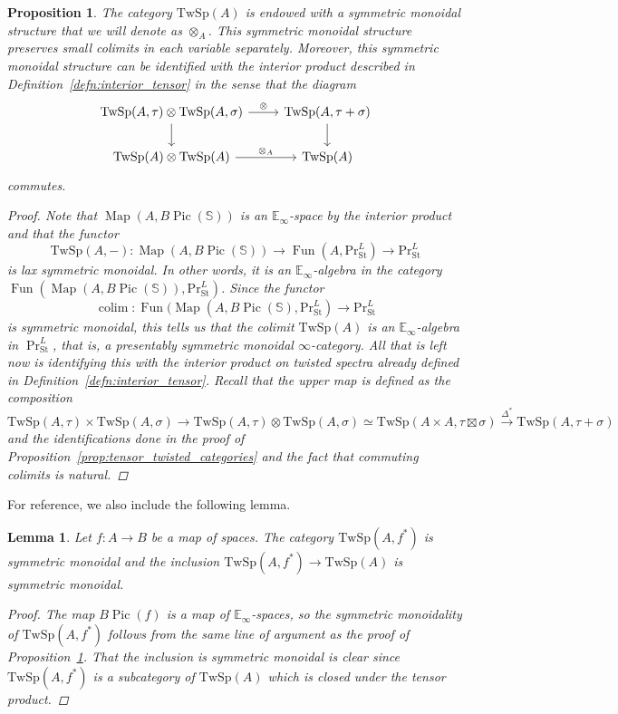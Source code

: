 \documentclass[10pt]{amsart}
\newcommand{\longto}{\longrightarrow}
\theoremstyle{plain}
\newtheorem{lemma}[theorem]{Lemma}
\newtheorem{proposition}[theorem]{Proposition}
\theoremstyle{definition}
\DeclareMathOperator*{\colim}{colim}
\DeclareMathOperator{\Fun}{Fun}
\DeclareMathOperator{\Pic}{Pic}
\DeclareMathOperator{\Map}{Map}
\newcommand{\St}{\mathrm{St}}
\newcommand{\bE}{\mathbb{E}}
\newcommand{\bS}{\mathbb{S}}
\newcommand{\TwSp}{\mathrm{TwSp}}
\begin{document}
\begin{proposition} \label{prop:total_cat_symm_mon}
  The category $\TwSp(A)$ is endowed with a symmetric monoidal structure that we will denote as $\otimes_A$.
  This symmetric monoidal structure preserves small colimits in each variable separately.
  Moreover, this symmetric monoidal structure can be identified with the interior product described in Definition~\ref{defn:interior_tensor} in the sense that the diagram
  \[
  \begin{tikzcd}
    \TwSp(A,\tau) \otimes \TwSp(A,\sigma) \arrow[r,"\otimes"] \arrow[d] & \TwSp(A , \tau + \sigma) \arrow[d] \\
    \TwSp(A) \otimes \TwSp(A) \arrow[r,"\otimes_A"] & \TwSp(A)
  \end{tikzcd}
  \]
  commutes.
  \begin{proof}
    Note that $\Map(A,B\Pic(\bS))$ is an $\bE_\infty$-space by the interior product and that the functor
    \[
    \TwSp(A,-) : \Map(A,B\Pic(\bS)) \longto \Fun(A,\mathrm{Pr}^{L}_{\St}) \longto \mathrm{Pr}^{L}_{\St}
    \]
    is lax symmetric monoidal. In other words, it is an $\bE_\infty$-algebra in the category $\Fun(\Map(A,B\Pic(\bS)),\mathrm{Pr}^{L}_{\St})$.
    Since the functor
    \[
    \colim : \Fun(\Map(A,B\Pic(\bS),\mathrm{Pr}^{L}_{\St}) \longto \mathrm{Pr}^{L}_{\St}
    \]
    is symmetric monoidal, this tells us that the colimit $\TwSp(A)$ is an $\bE_\infty$-algebra in $\Pr^L_{\St}$, that is, a presentably symmetric monoidal $\infty$-category.
    All that is left now is identifying this with the interior product on twisted spectra already defined in Definition~\ref{defn:interior_tensor}. Recall that the upper map is defined as the composition
    \[
    \TwSp(A,\tau) \times \TwSp(A,\sigma) \longto \TwSp(A,\tau) \otimes \TwSp(A,\sigma)  \simeq \TwSp(A \times A , \tau \boxtimes \sigma) \overset{\Delta^*}\longto \TwSp(A, \tau + \sigma)
    \]
    and the identifications done in the proof of Proposition~\ref{prop:tensor_twisted_categories} and the fact that commuting colimits is natural.
  \end{proof}
\end{proposition}

For reference, we also include the following lemma.

\begin{lemma} \label{lem:inclusion_symm_monoidal}
  Let $f : A \to B$ be a map of spaces. The category $\TwSp(A,f^*)$ is symmetric monoidal and the inclusion $\TwSp(A,f^*) \to \TwSp(A)$ is symmetric monoidal.
  \begin{proof}
    The map $B\Pic(f)$ is a map of $\bE_\infty$-spaces, so the symmetric monoidality of $\TwSp(A,f^*)$ follows from the same line of argument as the proof of Proposition~\ref{prop:total_cat_symm_mon}. That the inclusion is symmetric monoidal is clear since $\TwSp(A,f^*)$ is a subcategory of $\TwSp(A)$ which is closed under the tensor product.
  \end{proof}
\end{lemma}
\end{document}
